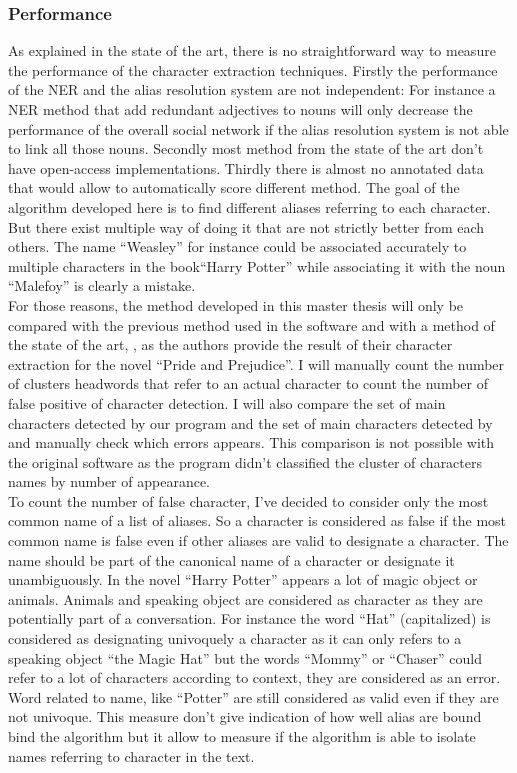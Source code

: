 \documentclass[a4paper, 12pt]{report}
\begin{document}
\subsubsection{Performance}
\label{performance}
As explained in the state of the art, there is no straightforward way to measure the performance of the character extraction techniques. Firstly the performance of the NER and the alias resolution system are not independent: For instance a NER method that add redundant adjectives to nouns will only decrease the performance of the overall social network if the alias resolution system is not able to link all those nouns. Secondly most method from the state of the art don't have open-access implementations. Thirdly there is almost no annotated data that would allow to automatically score different method. The goal of the algorithm developed here is to find different aliases referring to each character. But there exist multiple way of doing it that are not strictly better from each others. The name ``Weasley'' for instance could be associated accurately to multiple characters in the book``Harry Potter'' while associating it with the noun ``Malefoy'' is clearly a mistake.\\

For those reasons, the method developed in this master thesis will only be compared with the previous method used in the software \citep{original} and with a method of the state of the art, \cite{character_meta},  as the authors provide the result of their character extraction for the novel ``Pride and Prejudice''. I will manually count the number of clusters headwords that refer to an actual character to count the number of false positive of character detection. I will also compare the set of main characters detected by our program and the set of main characters detected by \cite{character_meta} and manually check which errors appears. This comparison is not possible with the original software as the program didn't classified the cluster of characters names by number of appearance.\\

To count the number of  false character, I've decided to consider only the most common name of a list of aliases. So a character is considered as false if the most common name is false even if other aliases are valid to designate a character. The name should be part of the canonical name of a character or designate it unambiguously. In the novel ``Harry Potter'' appears a lot of magic object or animals. Animals and speaking object are considered as character as they are potentially part of a conversation. For instance the word ``Hat'' (capitalized) is considered as designating univoquely a character as it can only refers to a speaking object ``the Magic Hat'' but the words ``Mommy'' or ``Chaser'' could refer to a lot of characters according to context, they are considered as an error. Word related to name, like ``Potter'' are still considered as valid even if they are not univoque. This measure don't give indication of how well alias are bound bind the algorithm but it allow to measure if the algorithm is able to isolate names referring to character in the text. \\
\end{document}
